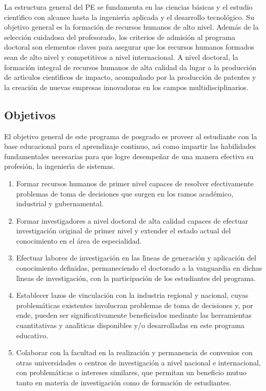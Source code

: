 \documentclass{article}
\begin{document}
La estructura general del PE se fundamenta en las ciencias b\'{a}sicas y
el estudio cient\'{\i}fico con alcance hasta la ingenier\'{\i}a aplicada y el
desarrollo tecnol\'{o}gico. Su objetivo general es la formaci\'{o}n de
recursos humanos de alto nivel. Adem\'{a}s de la selecci\'{o}n cuidadosa del
profesorado, los criterios de admisi\'{o}n al programa doctoral son
elementos claves para asegurar que los recursos humanos formados sean
de alto nivel y competitivos a nivel internacional.  A nivel doctoral,
la formaci\'{o}n integral de recursos humanos de alta calidad da lugar a
la producci\'{o}n de art\'{\i}culos cient\'{\i}ficos de impacto, acompa\~{n}ado por la
producci\'{o}n de patentes y la creaci\'{o}n de nuevas empresas innovadoras en
los campos multidisciplinarios.

\subsection{Objetivos}

El objetivo general de este programa de posgrado es proveer al
estudiante con la base educacional para el aprendizaje continuo, as\'{\i}
como impartir las habilidades fundamentales necesarias para que logre
desempe\~{n}ar de una manera efectiva su profesi\'{o}n, la ingenier\'{\i}a de
sistemas.

\begin{enumerate}
\item{Formar recursos humanos de primer nivel capaces de resolver
    efectivamente problemas de toma de decisiones que surgen en los
    ramos acad\'{e}mico, industrial y gubernamental.}
\item{Formar investigadores a nivel doctoral de alta calidad capaces
    de efectuar investigaci\'{o}n original de primer nivel y extender el
    estado actual del conocimiento en el \'{a}rea de especialidad.}
\item{Efectuar labores de investigaci\'{o}n en las l\'{\i}neas de generaci\'{o}n y
    aplicaci\'{o}n del conocimiento definidas, permaneciendo el doctorado
    a la vanguardia en dichas l\'{\i}neas de investigaci\'{o}n, con la
    participaci\'{o}n de los estudiantes del programa.}
\item{Establecer lazos de vinculaci\'{o}n con la industria regional y
    nacional, cuyas problem\'{a}ticas existentes involucran problemas de
    toma de decisiones y, por ende, pueden ser significativamente
    beneficiados mediante las herramientas cuantitativas y anal\'{\i}ticas
    disponibles y/o desarrolladas en este programa educativo.}
\item{Colaborar con la facultad en la realizaci\'{o}n y permanencia de
    convenios con otras universidades o centros de investigaci\'{o}n a
    nivel nacional e internacional, con problem\'{a}ticas o intereses
    similares, que permitan un beneficio mutuo tanto en materia de
    investigaci\'{o}n como de formaci\'{o}n de estudiantes.}
\end{enumerate}
\end{document}
